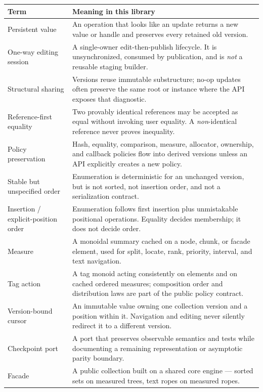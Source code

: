 \documentclass[11pt,twoside,openright]{book}
\makeatletter
\newenvironment{d7table}[1]
  {\par\vspace{3pt}\small
   \setlength{\LTpre}{4pt}\setlength{\LTpost}{4pt}
   \begin{longtable}{@{}%
     >{\raggedright\arraybackslash}p{#1\textwidth}%
     @{\hspace{10pt}}%
     >{\raggedright\arraybackslash}p{\dimexpr\textwidth-#1\textwidth-10pt\relax}@{}}}
  {\end{longtable}}
\newcommand{\thead}[1]{\sffamily\bfseries\footnotesize\color{d7ink}#1}
\makeatother
\begin{document}
\begin{d7table}{0.27}
\toprule
\thead{Term} & \thead{Meaning in this library} \\
\midrule
Persistent value & An operation that looks like an update returns a new value or
handle and preserves every retained old version. \\
One-way editing session & A single-owner edit-then-publish lifecycle. It is
unsynchronized, consumed by publication, and is \emph{not} a reusable staging
builder. \\
Structural sharing & Versions reuse immutable substructure; no-op updates often
preserve the same root or instance where the API exposes that diagnostic. \\
Reference-first equality & Two provably identical references may be accepted as
equal without invoking user equality. A \emph{non}-identical reference never
proves inequality. \\
Policy preservation & Hash, equality, comparison, measure, allocator, ownership,
and callback policies flow into derived versions unless an API explicitly
creates a new policy. \\
Stable but unspecified order & Enumeration is deterministic for an unchanged
version, but is not sorted, not insertion order, and not a serialization
contract. \\
Insertion / explicit-position order & Enumeration follows first insertion plus
unmistakable positional operations. Equality decides membership; it does not
decide order. \\
Measure & A monoidal summary cached on a node, chunk, or facade element, used
for split, locate, rank, priority, interval, and text navigation. \\
Tag action & A tag monoid acting consistently on elements and on cached ordered
measures; composition order and distribution laws are part of the public policy
contract. \\
Version-bound cursor & An immutable value owning one collection version and a
position within it. Navigation and editing never silently redirect it to a
different version. \\
Checkpoint port & A port that preserves observable semantics and tests while
documenting a remaining representation or asymptotic parity boundary. \\
Facade & A public collection built on a shared core engine --- sorted sets on
measured trees, text ropes on measured ropes. \\
\bottomrule
\end{d7table}
\end{document}
